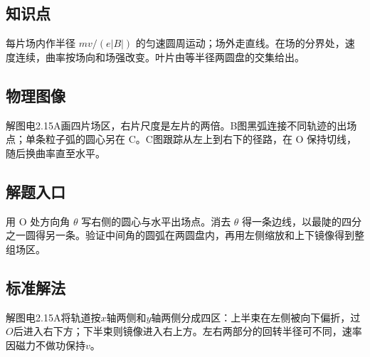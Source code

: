 \documentclass[UTF8,fontset=fandol,a4paper,11pt]{ctexart}
\begin{document}


\subsection*{知识点}

每片场内作半径 $mv/(e|B|)$ 的匀速圆周运动；场外走直线。在场的分界处，速度连续，曲率按场向和场强改变。叶片由等半径两圆盘的交集给出。



\subsection*{物理图像}

解图电2.15A画四片场区，右片尺度是左片的两倍。B图黑弧连接不同轨迹的出场点；单条粒子弧的圆心另在 C。C图跟踪从左上到右下的径路，在 O 保持切线，随后换曲率直至水平。



\subsection*{解题入口}

用 O 处方向角 $\theta$ 写右侧的圆心与水平出场点。消去 $\theta$ 得一条边线，以最陡的四分之一圆得另一条。验证中间角的圆弧在两圆盘内，再用左侧缩放和上下镜像得到整组场区。


\subsection*{标准解法}

解图电2.15A将轨道按$x$轴两侧和$y$轴两侧分成四区：上半束在左侧被向下偏折，过$O$后进入右下方；下半束则镜像进入右上方。左右两部分的回转半径可不同，速率因磁力不做功保持$v$。
\end{document}
